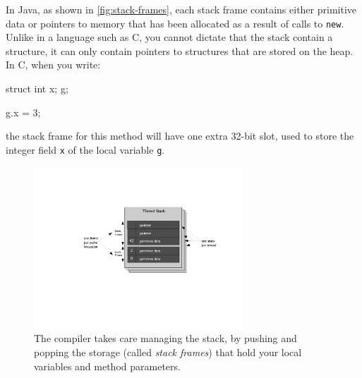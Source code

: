 In Java, as shown in \autoref{fig:stack-frames}, each stack frame contains
either primitive data or pointers to memory that has been allocated as a result
of calls to {\tt new}. Unlike in a language such as C, you cannot dictate that
the stack contain a structure, it can only contain pointers to structures that
are stored on the heap. In C, when you write:
\begin{shortlisting}
struct {
   int x;
} g;

g.x = 3;
\end{shortlisting}
the stack frame for this method will have one extra 32-bit slot, used to store
the integer field {\tt x} of the local variable {\tt g}. 

\begin{figure}
\centering
\includegraphics[width=0.7\textwidth]{part2/Figures/lifetime/heaps_and_stacks_stack_frames}
\caption{The compiler takes care managing the stack, by pushing and popping
the storage (called \emph{stack frames}) that hold your local variables and
method parameters.}
\label{fig:stack-frames}
\end{figure}

